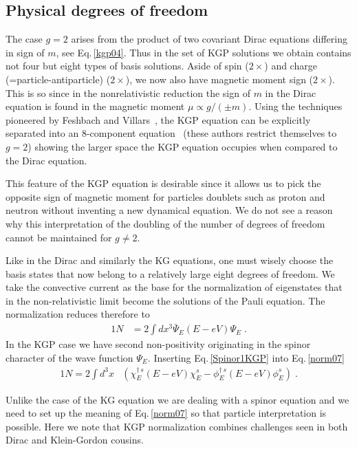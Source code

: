 \documentclass[epj]{svjour}
\begin{document}
\subsection{Physical degrees of freedom}\label{freedom}
The case $g=2$ arises from the product of two covariant Dirac equations differing in sign of $m$, see Eq.\,\eqref{kgp04}. Thus in the set of KGP solutions we obtain contains not four but eight types of basis solutions. Aside of spin ($2\times$) and charge (=particle-antiparticle) ($2\times$), we now also have magnetic moment sign ($2\times$). This is so since in the nonrelativistic reduction the sign of $m$ in the Dirac equation is found in the magnetic moment $\mu\propto g/(\pm m)$. Using the techniques pioneered by Feshbach and Villars~\cite{Feshbach:1958wv}, the KGP equation can be explicitly separated into an 8-component equation~\cite{Robson:1996et,Staudte:1996ey} (these authors restrict themselves to $g=2$) showing the larger space the KGP equation occupies when compared to the Dirac equation.  

This feature of the KGP equation is desirable since it allows us to pick the opposite sign of magnetic moment for particles doublets such as proton and neutron without inventing a new dynamical equation. We do not see a reason why this interpretation of the doubling of the number of degrees of freedom cannot be maintained for $g\ne 2$. 

Like in the Dirac and similarly the KG equations, one must wisely choose the basis states that now belong to a relatively large eight degrees of freedom. We take the convective current as the base for the normalization of eigenstates that in the non-relativistic limit become the solutions of the Pauli equation. The normalization reduces therefore to
\begin{alignat}{1}
\label{norm07}
 N&=2\int dx^{3}\bar{\Psi}_{E}\left(E-eV\right)\Psi_{E}\;.
\end{alignat}
In the KGP case we have second non-positivity originating in the spinor character of the wave function $\Psi_{E}$. Inserting Eq.\,\eqref{Spinor1KGP} into Eq.\,\eqref{norm07} 
\begin{alignat}{1}
N=\!2\!\!\int \!\!d^{3}x\!
&\left(\!\chi_{E}^{\dagger\,s}\left(E-eV\right)\chi_{E}^s
- %
 \phi_{E}^{\dagger\,s}\left(E-eV\right)\phi_{E}^s\right)\;.
\label{norm08} 
\end{alignat}

Unlike the case of the KG equation we are dealing with a spinor equation and we need to set up the meaning of Eq.\,\eqref{norm07} so that particle interpretation is possible. Here we note that KGP normalization combines challenges seen in both Dirac and Klein-Gordon cousins. 
\end{document}
